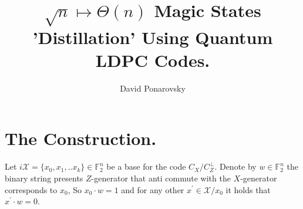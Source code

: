 \documentclass[manuscript,screen,review]{acmart}
\begin{document}

\title{ $\sqrt{n} \mapsto \Theta(n)$  Magic States 'Distillation' Using
Quantum LDPC Codes. }
\author{David Ponarovsky}
\maketitle





\section{The Construction.} 


Let $i\mathcal{X} = \{x_{0}, x_{1}, .. x_{k}\} \in \mathbb{F}_{2}^{n}$ be a base for the code $C_{X}/C_{Z}^\perp$.  Denote by $w \in \mathbb{F}_{2}^{n}$ the binary string presents $Z$-generator that anti commute with the $X$-generator corresponds to $x_{0}$, So $x_{0}\cdot w = 1$ and for any other  $x^\prime \in \mathcal{X}/x_{0}$ it holds that $x^{\prime}\cdot w = 0 $.


 



\printbibliography
\end{document}
